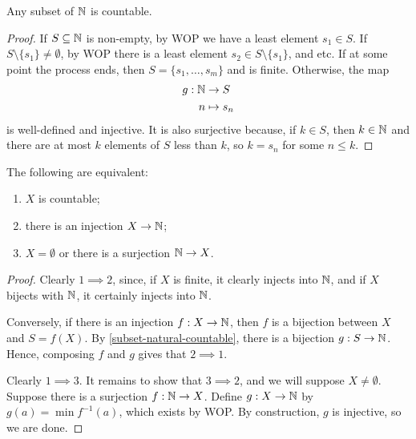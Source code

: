 \documentclass{../../template/note}
\begin{document}
    \begin{lemma}
        \label{subset-natural-countable}
        Any subset of \(\mathbb N\) is countable.
    \end{lemma}
    
    \begin{proof}
        If \(S \subseteq \mathbb N\) is non-empty, by WOP we have a least element \(s_1 \in S\). If \(S \setminus \{s_1\} \neq \emptyset\), by WOP there is a least element \(s_2 \in S \setminus \{s_1\}\), and etc. If at some point the process ends, then \(S = \{s_1, \dots, s_m\}\) and is finite. Otherwise, the map
        \begin{align*}
            g: \mathbb N &\to S \\
            n &\mapsto s_n
        \end{align*}
        is well-defined and injective. It is also surjective because, if \(k \in S\), then \(k \in \mathbb N\) and there are at most \(k\) elements of \(S\) less than \(k\), so \(k = s_n\) for some \(n \leq k\).
        
    \end{proof}
    

    \begin{theorem}
        The following are equivalent:
        \begin{enumerate}
            \item \(X\) is countable;
            \item there is an injection \(X \to \mathbb N\);
            \item \(X = \emptyset\) or there is a surjection \(\mathbb N \to X\).
        \end{enumerate}
    \end{theorem}
    
    \begin{proof}
        Clearly \(1 \implies 2\), since, if \(X\) is finite, it clearly injects into \(\mathbb N\), and if \(X\) bijects with \(\mathbb N\), it certainly injects into \(\mathbb N\). 

        Conversely, if there is an injection \(f: X \to \mathbb N\), then \(f\) is a bijection between \(X\) and \(S = f(X)\). By \cref{subset-natural-countable}, there is a bijection \(g: S \to \mathbb N\). Hence, composing \(f\) and \(g\) gives that \(2 \implies 1\).

        Clearly \(1 \implies 3\). It remains to show that \(3 \implies 2\), and we will suppose \(X \neq \emptyset\). Suppose there is a surjection \(f: \mathbb N \to X\). Define \(g: X \to \mathbb N\) by \(g(a) = \min f^{-1}(a)\), which exists by WOP. By construction, \(g\) is injective, so we are done.
    \end{proof}
    
\end{document}

